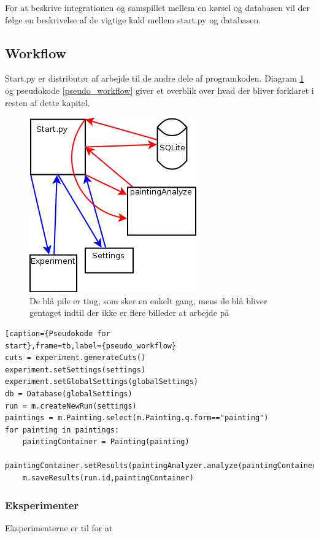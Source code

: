 {
For at beskrive integrationen og samspillet mellem en kørsel og
databasen vil der følge en beskrivelse af de vigtige kald mellem 
start.py og databasen. 
\subsection{Workflow}
Start.py er distributør af arbejde til de andre dele af programkoden.
Diagram \ref{start_workflow} og pseudokode \ref{pseudo_workflow} giver et overblik over hvad der bliver
forklaret i resten af dette kapitel. 
\begin{figure}[h!]
	\begin{center}
		\includegraphics[scale=0.5]{afsnit/implementation/billeder/workflow_start_py.png}
	\end{center}
	\caption{De blå pile er ting, som sker en enkelt gang, mens de blå
	\label{start_workflow}
	bliver gentaget indtil der ikke er flere billeder at arbejde på}
\end{figure}
\begin{lstlisting}[caption={Pseudokode for
start},frame=tb,label={pseudo_workflow}
cuts = experiment.generateCuts()
experiment.setSettings(settings)
experiment.setGlobalSettings(globalSettings)
db = Database(globalSettings)
run = m.createNewRun(settings)
paintings = m.Painting.select(m.Painting.q.form=="painting")
for painting in paintings:
	paintingContainer = Painting(painting)
	paintingContainer.setResults(paintingAnalyzer.analyze(paintingContainer,settings))
	m.saveResults(run.id,paintingContainer)
\end{lstlisting}
\subsubsection{Eksperimenter}
Eksperimenterne er til for at 
}
